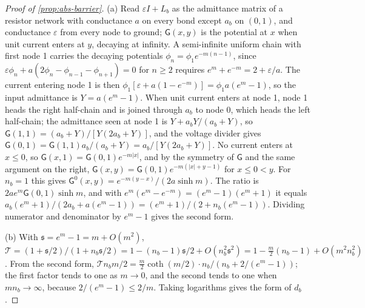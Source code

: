 \begin{proof}[Proof of \cref{prop:abs-barrier}]
(a) Read $\varepsilon I+L_b$ as the admittance matrix of a resistor network with conductance $a$ on every bond except $a_b$ on $(0,1)$, and conductance $\varepsilon$ from every node to ground; $\mathsf G(x,y)$ is the potential at $x$ when unit current enters at $y$, decaying at infinity. A semi-infinite uniform chain with first node 1 carries the decaying potentials $\phi_n=\phi_1e^{-m(n-1)}$, since $\varepsilon\phi_n+a(2\phi_n-\phi_{n-1}-\phi_{n+1})=0$ for $n\ge2$ requires $e^m+e^{-m}=2+\varepsilon/a$. The current entering node 1 is then $\phi_1[\varepsilon+a(1-e^{-m})]=\phi_1a(e^m-1)$, so the input admittance is $Y=a(e^m-1)$. When unit current enters at node 1, node 1 heads the right half-chain and is joined through $a_b$ to node 0, which heads the left half-chain; the admittance seen at node 1 is $Y+a_bY/(a_b+Y)$, so $\mathsf G(1,1)=(a_b+Y)/[Y(2a_b+Y)]$, and the voltage divider gives $\mathsf G(0,1)=\mathsf G(1,1)a_b/(a_b+Y)=a_b/[Y(2a_b+Y)]$. No current enters at $x\le0$, so $\mathsf G(x,1)=\mathsf G(0,1)e^{-m\lvert x\rvert}$, and by the symmetry of $\mathsf G$ and the same argument on the right, $\mathsf G(x,y)=\mathsf G(0,1)e^{-m(\lvert x\rvert+y-1)}$ for $x\le0<y$. For $n_b=1$ this gives $\mathsf G^0(x,y)=e^{-m(y-x)}/(2a\sinh m)$. The ratio is $2ae^m\mathsf G(0,1)\sinh m$, and with $e^m(e^m-e^{-m})=(e^m-1)(e^m+1)$ it equals $a_b(e^m+1)/(2a_b+a(e^m-1))=(e^m+1)/(2+n_b(e^m-1))$. Dividing numerator and denominator by $e^m-1$ gives the second form.

(b) With $\mathfrak s=e^m-1=m+O(m^2)$, $\mathcal T=(1+\mathfrak s/2)/(1+n_b\mathfrak s/2)=1-(n_b-1)\mathfrak s/2+O(n_b^2\mathfrak s^2)=1-\frac m2(n_b-1)+O(m^2n_b^2)$. From the second form, $\mathcal Tn_bm/2=\frac m2\coth(m/2)\cdot n_b/(n_b+2/(e^m-1))$; the first factor tends to one as $m\to0$, and the second tends to one when $mn_b\to\infty$, because $2/(e^m-1)\le2/m$. Taking logarithms gives the form of $d_b$.


\end{proof}
